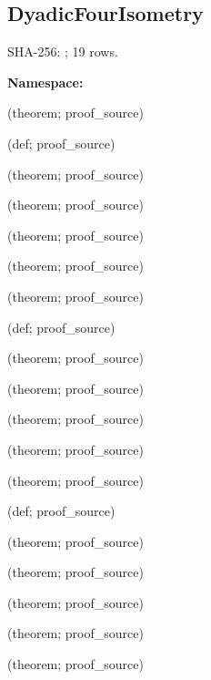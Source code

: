 \subsection*{DyadicFourIsometry}
{\footnotesize SHA-256: ; 19 rows.}\par
\begingroup\small
\textbf{Namespace:} \par
\noindent{} {\scriptsize (theorem; proof\_source)}\par
\noindent{} {\scriptsize (def; proof\_source)}\par
\noindent{} {\scriptsize (theorem; proof\_source)}\par
\noindent{} {\scriptsize (theorem; proof\_source)}\par
\noindent{} {\scriptsize (theorem; proof\_source)}\par
\noindent{} {\scriptsize (theorem; proof\_source)}\par
\noindent{} {\scriptsize (theorem; proof\_source)}\par
\noindent{} {\scriptsize (def; proof\_source)}\par
\noindent{} {\scriptsize (theorem; proof\_source)}\par
\noindent{} {\scriptsize (theorem; proof\_source)}\par
\noindent{} {\scriptsize (theorem; proof\_source)}\par
\noindent{} {\scriptsize (theorem; proof\_source)}\par
\noindent{} {\scriptsize (theorem; proof\_source)}\par
\noindent{} {\scriptsize (def; proof\_source)}\par
\noindent{} {\scriptsize (theorem; proof\_source)}\par
\noindent{} {\scriptsize (theorem; proof\_source)}\par
\noindent{} {\scriptsize (theorem; proof\_source)}\par
\noindent{} {\scriptsize (theorem; proof\_source)}\par
\noindent{} {\scriptsize (theorem; proof\_source)}\par
\endgroup
